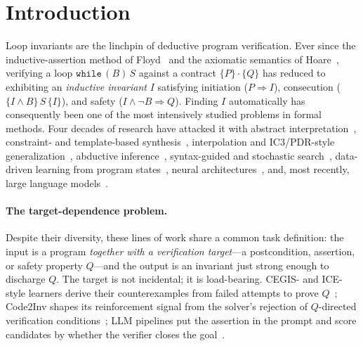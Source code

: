 \section{Introduction}\label{sec:intro}



Loop invariants are the linchpin of deductive program verification.
Ever since the inductive-assertion method of Floyd~\citep{floyd1967assigning} and the axiomatic semantics of Hoare~\citep{hoare1969axiomatic}, verifying a loop $\mathtt{while}\,(B)\,S$ against a contract $\{P\}\cdot\{Q\}$ has reduced to exhibiting an \emph{inductive invariant} $I$ satisfying initiation ($P \Rightarrow I$), consecution ($\{I \wedge B\}\,S\,\{I\}$), and safety ($I \wedge \neg B \Rightarrow Q$).
Finding $I$ automatically has consequently been one of the most intensively studied problems in formal methods.
Four decades of research have attacked it with abstract interpretation~\citep{cousot1977abstract,cousot1978automatic,karr1976affine}, constraint- and template-based synthesis~\citep{colon2003linear,sankaranarayanan2004non,gulwani2008program,gupta2009invgen}, interpolation and IC3/PDR-style generalization~\citep{mcmillan2003interpolation,bradley2011sat,komuravelli2014smt}, abductive inference~\citep{dillig2013inductive}, syntax-guided and stochastic search~\citep{alur2013sygus,fedyukovich2018syntax}, data-driven learning from program states~\citep{sharma2012interpolants,sharma2013data,garg2014ice,garg2016learning,padhi2016pie,zhu2018data,ezudheen2018horn}, neural architectures~\citep{si2018learning,si2020code2inv,ryan2020cln2inv,yao2020gcln}, and, most recently, large language models~\citep{pei2023can,kamath2023finding,chakraborty2023ranking,wu2024lemur,wu2024lam4inv,liu2024acinv,wen2024enchanting,liu2024towards}.

\paragraph{The target-dependence problem.}
Despite their diversity, these lines of work share a common task definition: the input is a program \emph{together with a verification target}---a postcondition, assertion, or safety property $Q$---and the output is an invariant just strong enough to discharge $Q$.
The target is not incidental; it is load-bearing.
CEGIS- and ICE-style learners derive their counterexamples from failed attempts to prove $Q$~\citep{garg2014ice,garg2016learning,padhi2016pie}; Code2Inv shapes its reinforcement signal from the solver's rejection of $Q$-directed verification conditions~\citep{si2018learning,si2020code2inv}; LLM pipelines put the assertion in the prompt and score candidates by whether the verifier closes the goal~\citep{kamath2023finding,chakraborty2023ranking,wu2024lemur,wu2024lam4inv,liu2024acinv}.

